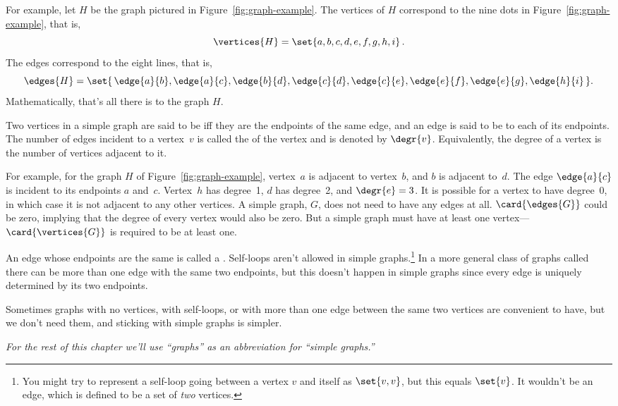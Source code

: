 For example, let $H$ be the graph pictured in
Figure~\ref{fig:graph-example}.  The vertices of $H$ correspond to the
nine dots in Figure~\ref{fig:graph-example}, that is,
\[
\vertices{H} =  \set{a, b, c, d, e, f, g, h, i}\, .
\]
The edges correspond to the eight lines, that is,
\[
\edges{H} =  \set{\, \edge{a}{b}, \edge{a}{c}, \edge{b}{d}, \edge{c}{d},
              \edge{c}{e}, \edge{e}{f}, \edge{e}{g}, \edge{h}{i} \,}.
\]
Mathematically, that's all there is to the graph $H$.

\begin{definition}
Two vertices in a simple graph are said to be  iff they
are the endpoints of the same edge, and an edge is said to be
 to each of its endpoints.  The number of edges
incident to a vertex~$v$ is called the  of the vertex and
is denoted by $\degr{v}$.  Equivalently, the degree of a vertex is the
number of vertices adjacent to it.
\end{definition}

For example, for the graph $H$ of Figure~\ref{fig:graph-example},
vertex~$a$ is adjacent to vertex~$b$, and $b$ is adjacent to~$d$.  The
edge $\edge{a}{c}$ is incident to its endpoints $a$ and~$c$.
Vertex~$h$ has degree~1, $d$ has degree~2, and $\degr{e} = 3$.  It is
possible for a vertex to have degree~0, in which case it is not
adjacent to any other vertices.  A simple graph, $G$, does not need to
have any edges at all. $\card{\edges{G}}$ could be zero, implying that
the degree of every vertex would also be zero.  But a simple graph
must have at least one vertex---$\card{\vertices{G}}$ is
required to be at least one.

An edge whose endpoints are the same is called a .
Self-loops aren't allowed in simple graphs.\footnote{You might try to
  represent a self-loop going between a vertex $v$ and itself as
  $\set{v, v}$, but this equals $\set{v}$. It wouldn't be an edge,
  which is defined to be a set of \emph{two} vertices.}  In a more
general class of graphs called  there can be more
than one edge with the same two endpoints, but this doesn't happen in
simple graphs since every edge is uniquely determined by its two
endpoints.

Sometimes graphs with no vertices, with self-loops, or with more than one
edge between the same two vertices are convenient to have, but we don't
need them, and sticking with simple graphs is simpler.

\emph{For the rest of this chapter we'll use ``graphs'' as an abbreviation
  for ``simple graphs.''}

